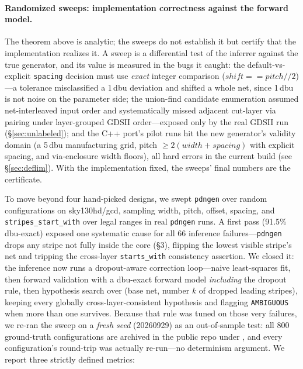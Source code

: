 \documentclass[11pt]{article}
\begin{document}
\paragraph{Randomized sweeps: implementation correctness against the
forward model.}
\label{sec:sweep}
The theorem above is analytic; the sweeps do not establish it but
certify that the implementation realizes it.  A sweep is a differential
test of the inferrer against the true generator, and its value is
measured in the bugs it caught: the default-vs-explicit
\texttt{spacing} decision must use \emph{exact} integer comparison
($\mathit{shift} == \mathit{pitch}//2$)---a tolerance misclassified a
1\,dbu deviation and shifted a whole net, since 1\,dbu is not noise on
the parameter side; the union-find candidate enumeration assumed
net-interleaved input order and systematically missed adjacent cut-layer
via pairing under layer-grouped GDSII order---exposed only by the real
GDSII run (\S\ref{sec:unlabeled}); and the C++ port's pilot runs hit the
new generator's validity domain (a 5\,dbu manufacturing grid, pitch
$\geq 2(\mathit{width}+\mathit{spacing})$ with explicit spacing, and
via-enclosure width floors), all hard errors in the current build (see
\S\ref{sec:deflim}).  With the implementation fixed, the sweeps' final
numbers are the certificate.

To move beyond four hand-picked designs, we swept \texttt{pdngen} over
random configurations on sky130hd/gcd, sampling width, pitch, offset,
spacing, and \texttt{stripes\_start\_with} over legal ranges in real
\texttt{pdngen} runs.  A first pass (91.5\%
dbu-exact) exposed one systematic cause for all 66 inference
failures---\texttt{pdngen} drops any stripe not fully inside the core
(\S3), flipping the lowest visible stripe's net and tripping the
cross-layer \texttt{starts\_with} consistency assertion.  We closed it:
the inference now runs a dropout-aware correction loop---naive
least-squares fit, then forward validation with a dbu-exact forward
model \emph{including} the dropout rule, then hypothesis search over
(base net, number $k$ of dropped leading stripes), keeping every
globally cross-layer-consistent hypothesis and flagging
\texttt{AMBIGUOUS} when more than one survives.
Because that rule was tuned on those very failures, we re-ran the sweep
on a \emph{fresh seed} (20260929) as an out-of-sample test: all 800
ground-truth configurations are archived in the public repo under
, and every configuration's round-trip
was actually re-run---no determinism argument.  We report
three strictly defined metrics:
\end{document}
